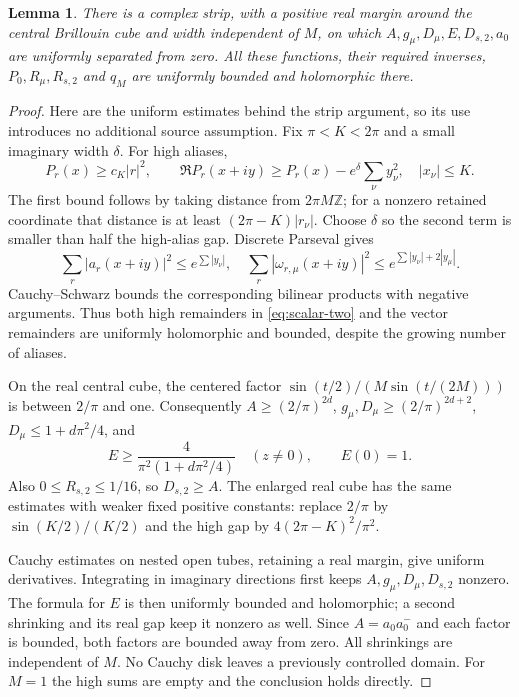 \documentclass[11pt]{article}
\newtheorem{lemma}[theorem]{Lemma}
\theoremstyle{remark}
\begin{document}
\begin{lemma}\label{lem:strip}
There is a complex strip, with a positive real margin around the
central Brillouin cube and width independent of $M$, on which
$A,g_\mu,D_\mu,E,D_{s,2},a_0$ are uniformly separated from zero.
All these functions, their required inverses, $P_0,R_\mu,R_{s,2}$
and $q_M$ are uniformly bounded and holomorphic there.
\end{lemma}

\begin{proof}
Here are the uniform estimates behind the strip argument, so its
use introduces no additional source assumption. Fix $\pi<K<2\pi$
and a small imaginary width $\delta$. For high aliases,
\[
 P_r(x)\ge c_K|r|^2,\qquad
 \Re P_r(x+iy)\ge P_r(x)-e^\delta\sum_\nu y_\nu^2,
 \quad |x_\nu|\le K.
\]
The first bound follows by taking distance from $2\pi M\mathbb Z$;
for a nonzero retained coordinate that distance is at least
$(2\pi-K)|r_\nu|$. Choose $\delta$ so the second term is smaller
than half the high-alias gap. Discrete Parseval gives
\[
 \sum_r|a_r(x+iy)|^2\le e^{\sum|y_\nu|},\quad
 \sum_r|\omega_{r,\mu}(x+iy)|^2
       \le e^{\sum|y_\nu|+2|y_\mu|}.
\]
Cauchy--Schwarz bounds the corresponding bilinear products with
negative arguments. Thus both high remainders in
\eqref{eq:scalar-two} and the vector remainders are uniformly
holomorphic and bounded, despite the growing number of aliases.

On the real central cube, the centered factor
$\sin(t/2)/(M\sin(t/(2M)))$ is between $2/\pi$ and one.
Consequently $A\ge(2/\pi)^{2d}$,
$g_\mu,D_\mu\ge(2/\pi)^{2d+2}$,
$D_\mu\le1+d\pi^2/4$, and
\[
 E\ge\frac{4}{\pi^2(1+d\pi^2/4)}\quad(z\ne0),
 \qquad E(0)=1.
\]
Also $0\le R_{s,2}\le1/16$, so
$D_{s,2}\ge A$. The enlarged real cube has the same estimates
with weaker fixed positive constants: replace $2/\pi$ by
$\sin(K/2)/(K/2)$ and the high gap by
$4(2\pi-K)^2/\pi^2$.

Cauchy estimates on nested open tubes, retaining a real margin,
give uniform derivatives. Integrating in imaginary directions first
keeps $A,g_\mu,D_\mu,D_{s,2}$ nonzero. The formula for $E$ is
then uniformly bounded and holomorphic; a second shrinking and its
real gap keep it nonzero as well. Since $A=a_0a_0^-$ and each
factor is bounded, both factors are bounded away from zero.
All shrinkings are independent of $M$. No Cauchy disk leaves a
previously controlled domain. For $M=1$ the high sums are empty
and the conclusion holds directly.
\end{proof}
\end{document}
